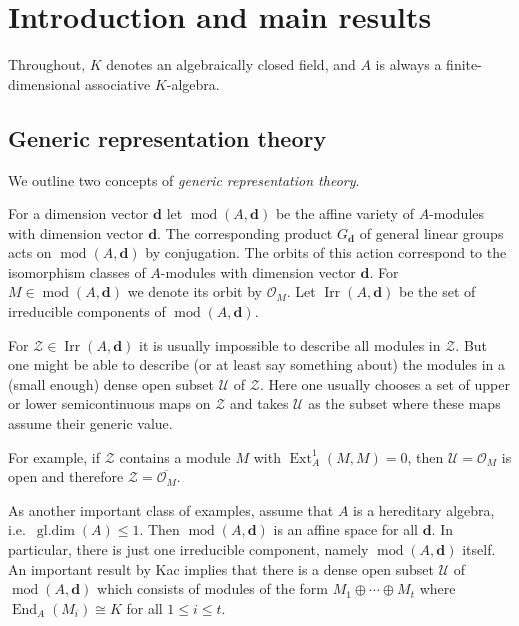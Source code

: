 \documentclass[12pt,reqno]{amsart}
\theoremstyle{definition}
\newcommand{\cO}{{\mathcal O}}
\newcommand{\bd}{\mathbf{d}}
\newcommand{\md}{\operatorname{mod}}
\newcommand{\gldim}{\operatorname{gl.dim}}
\newcommand{\Ext}{\operatorname{Ext}}
\newcommand{\End}{\operatorname{End}}
\newcommand{\irr}{\operatorname{Irr}}
\newcommand{\calU}{\mathcal{U}}
\newcommand{\calZ}{\mathcal{Z}}
\begin{document}
\setcounter{tocdepth}{1}
\tableofcontents

\parskip2mm


\section{Introduction and main results}


Throughout, $K$ denotes an algebraically closed field, and
$A$ is always a finite-dimensional associative $K$-algebra.

\subsection{Generic representation theory}
We outline two concepts of
\emph{generic representation theory}.

For a dimension vector $\bd$ let
$\md(A,\bd)$ be the affine variety of $A$-modules
with dimension vector $\bd$.
The corresponding product $G_\bd$ of general linear groups
acts on $\md(A,\bd)$ by conjugation.
The orbits of this action correspond to the isomorphism classes of $A$-modules with dimension vector $\bd$.
For $M \in \md(A,\bd)$ we denote its orbit by $\cO_M$.
Let $\irr(A,\bd)$ be the set of irreducible components of $\md(A,\bd)$.

For $\calZ \in \irr(A,\bd)$ it is usually impossible to describe all modules
in $\calZ$. But one might be able to describe (or at least say something
about) the modules in a (small enough) dense open subset $\calU$ of $\calZ$.
Here one usually chooses a set of upper or lower semicontinuous maps
on $\calZ$ and takes $\calU$ as the subset where these maps assume their
generic value.

For example, if $\calZ$ contains a module $M$ with $\Ext_A^1(M,M) = 0$,
then $\calU = \cO_M$ is open and therefore $\calZ = \overline{\cO_M}$.

As another important class of examples, assume that
$A$ is a hereditary algebra, i.e.\ $\gldim(A) \le 1$.
Then $\md(A,\bd)$ is an affine space for all $\bd$.
In particular, there is just one irreducible component, namely $\md(A,\bd)$ itself.
An important result by Kac \cite[Proposition~1]{K82} implies that
there is a dense open subset $\calU$ of $\md(A,\bd)$ which consists of
modules of the form $M_1 \oplus \cdots \oplus M_t$ where
$\End_A(M_i) \cong K$ for all $1 \le i \le t$.
\end{document}
